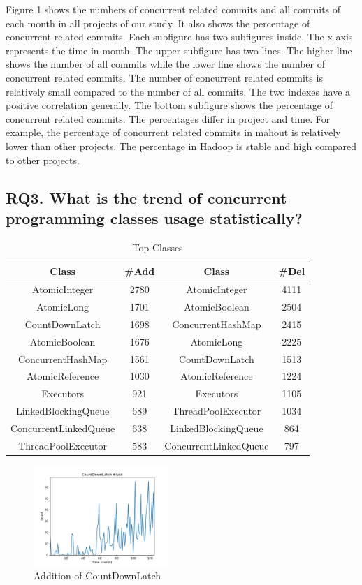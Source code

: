 \documentclass[conference]{IEEEtran}
\begin{document}
Figure 1 shows the numbers of concurrent related commits and all commits of each month in all projects of our study. It also shows the percentage of concurrent related commits. Each subfigure has two subfigures inside. The x axis represents the time in month. The upper subfigure has two lines. The higher line shows the number of all commits while the lower line shows the number of concurrent related commits. The number of concurrent related commits is relatively small compared to the number of all commits. The two indexes have a positive correlation generally. The bottom subfigure shows the percentage of concurrent related commits. The percentages differ in project and time. For example, the percentage of concurrent related commits in mahout is relatively lower than other projects. The percentage in Hadoop is stable and high compared to other projects.

\subsection{RQ3. What is the trend of concurrent programming classes usage statistically?}

\begin{table}
	\centering
	\caption{Top Classes}
	\begin{tabular}{|c|c||c|c|}\hline
		Class&\#Add&Class&\#Del\\\hline
		AtomicInteger&2780&AtomicInteger&4111\\\hline
		AtomicLong&1701&AtomicBoolean&2504\\\hline
		CountDownLatch&1698&ConcurrentHashMap&2415\\\hline
		AtomicBoolean&1676&AtomicLong&2225\\\hline
		ConcurrentHashMap&1561&CountDownLatch&1513\\\hline
		AtomicReference&1030&AtomicReference&1224\\\hline
		Executors&921&Executors&1105\\\hline
		LinkedBlockingQueue&689&ThreadPoolExecutor&1034\\\hline
		ConcurrentLinkedQueue&638&LinkedBlockingQueue&864\\\hline
		ThreadPoolExecutor&583&ConcurrentLinkedQueue&797\\\hline
	\end{tabular}
\end{table}

\begin{figure}
	\centering
	\includegraphics[height=1.5in]{CountDownLatchAdd}
	\caption{Addition of CountDownLatch}
\end{figure}
\end{document}
